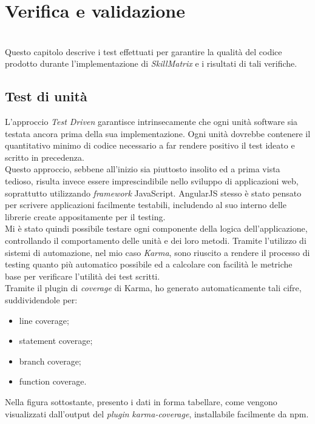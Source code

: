 
\chapter{Verifica e validazione}
\label{cap:verifica-validazione}

\\
Questo capitolo descrive i test effettuati per garantire la qualità del codice prodotto durante l'implementazione di \emph{SkillMatrix} e i risultati di tali verifiche.

\section{Test di unità}
L'approccio \emph{Test Driven} garantisce intrinsecamente che ogni unità software sia testata ancora prima della sua implementazione. Ogni unità dovrebbe contenere il quantitativo minimo di codice necessario a far rendere positivo il test ideato e scritto in precedenza.\\
Questo approccio, sebbene all'inizio sia piuttosto insolito ed a prima vista tedioso, risulta invece essere imprescindibile nello sviluppo di applicazioni web, soprattutto utilizzando \emph{framework} JavaScript. AngularJS stesso è stato pensato per scrivere applicazioni facilmente testabili, includendo al suo interno delle librerie create appositamente per il testing.\\
Mi è stato quindi possibile testare ogni componente della logica dell'applicazione, controllando il comportamento delle unità e dei loro metodi. Tramite l'utilizzo di sistemi di automazione, nel mio caso \emph{Karma}, sono riuscito a rendere il processo di testing quanto più automatico possibile ed a calcolare con facilità le metriche base per verificare l'utilità dei test scritti.\\
Tramite il plugin di \emph{coverage} di Karma, ho generato automaticamente tali cifre, suddividendole per:
\begin{itemize}
	\item line coverage;
	\item statement coverage;
	\item branch coverage;
	\item function coverage.
\end{itemize}
Nella figura sottostante, presento i dati in forma tabellare, come vengono visualizzati dall'output del \emph{plugin} \emph{karma-coverage}, installabile facilmente da \gls{npm}.

